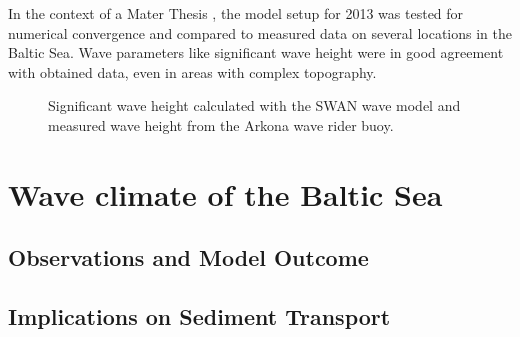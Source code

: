 In the context of a Mater Thesis \citep[][]{masterarbeitronja}, the model setup for 2013 was tested for numerical convergence and compared to measured data on several locations in the Baltic Sea. Wave parameters like significant wave height were in good agreement with obtained data, even in areas with complex topography.

\begin{figure}[h]
 \caption{Significant wave height calculated with the SWAN wave model and measured wave height from the Arkona wave rider buoy.}
\end{figure}

\section{Wave climate of the Baltic Sea}	

\subsection{Observations and Model Outcome}

\subsection{Implications on Sediment Transport}